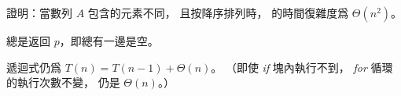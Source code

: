 \startEXERCISE
證明：當數列 $A$ 包含的元素不同，
且按降序排列時，  的時間復雜度爲 $\Theta(n^2)$。
\stopEXERCISE

\startANSWER
{} 總是返回 $p$，即總有一邊是空。

遞迴式仍爲 $T(n)=T(n-1)+\Theta(n)$。
（即使 \emph{if} 塊內執行不到， \emph{for} 循環的執行次數不變，
仍是 $\Theta(n)$。）
\stopANSWER
